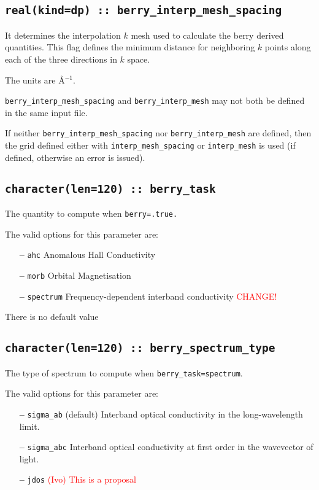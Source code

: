 \subsection[berry\_interp\_mesh\_spacing]{\tt real(kind=dp) :: berry\_interp\_mesh\_spacing}
It determines the interpolation $k$ mesh used to calculate the berry
derived quantities. This flag
defines the minimum distance for neighboring $k$ points along each of
the three directions in $k$ space. 


The units are \AA$^{-1}$.

{\tt berry\_interp\_mesh\_spacing} and  {\tt berry\_interp\_mesh} may not both be defined in the same input file.

If neither {\tt berry\_interp\_mesh\_spacing} nor  {\tt berry\_interp\_mesh} are defined, then the grid defined either with {\tt interp\_mesh\_spacing} or {\tt interp\_mesh} is used (if defined, otherwise an error is issued).



\subsection[berry\_task]{\tt character(len=120) ::  berry\_task}
The quantity to compute when {\tt berry=.true.}

The valid options for this parameter are:
\begin{itemize}
\item[{\bf --}]  \verb#ahc# Anomalous Hall Conductivity
\item[{\bf --}]  \verb#morb# Orbital Magnetisation
\item[{\bf --}] \verb#spectrum# Frequency-dependent interband conductivity \textcolor{red}{CHANGE!}

\end{itemize}
There is no default value



\subsection[berry\_spectrum\_type]{\tt character(len=120) ::  berry\_spectrum\_type}
The type of spectrum to compute when {\tt berry\_task=spectrum}. 

The valid options for this parameter are:
\begin{itemize}
\item[{\bf --}]  \verb#sigma_ab# (default) Interband optical conductivity
in the long-wavelength limit.
\item[{\bf --}]  \verb#sigma_abc# Interband optical conductivity
at first order in the wavevector of light.
\item [{\bf --}]  \verb#jdos# \textcolor{red}{(Ivo) This is a proposal}
\end{itemize}

